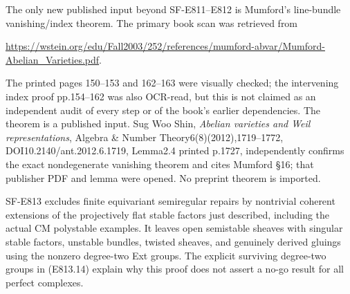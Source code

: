The only new published input beyond SF-E811--E812 is Mumford's
line-bundle vanishing/index theorem. The primary book scan was retrieved
from

\url{https://wstein.org/edu/Fall2003/252/references/mumford-abvar/Mumford-Abelian_Varieties.pdf}.

The printed pages 150--153 and 162--163 were visually checked; the
intervening index proof pp.154--162 was also OCR-read, but this is not
claimed as an independent audit of every step or of the book's earlier
dependencies. The theorem is a published input. Sug Woo Shin,
\emph{Abelian varieties and Weil representations}, Algebra \& Number
Theory6(8)(2012),1719--1772, DOI10.2140/ant.2012.6.1719, Lemma2.4
printed p.1727, independently confirms the exact nondegenerate vanishing
theorem and cites Mumford §16; that publisher PDF and lemma were opened.
No preprint theorem is imported.

SF-E813 excludes finite equivariant semiregular repairs by nontrivial
coherent extensions of the projectively flat stable factors just
described, including the actual CM polystable examples. It leaves open
semistable sheaves with singular stable factors, unstable bundles,
twisted sheaves, and genuinely derived gluings using the nonzero
degree-two Ext groups. The explicit surviving degree-two groups in
(E813.14) explain why this proof does not assert a no-go result for all
perfect complexes.
